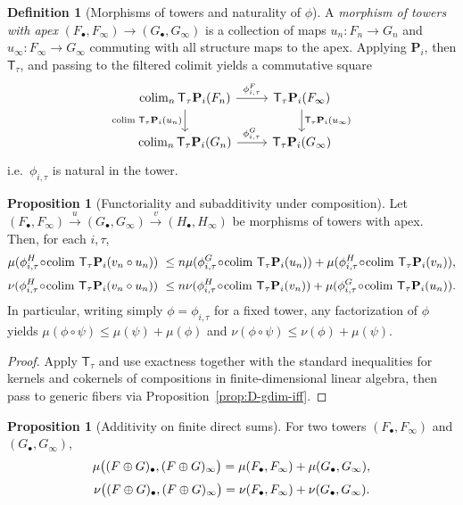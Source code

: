 \documentclass[11pt]{article}
\numberwithin{equation}{section}
\theoremstyle{plain}
\theoremstyle{definition}
\theoremstyle{remark}
\DeclareMathOperator{\colim}{colim}
\newcommand{\T}{\mathsf{T}}
\theoremstyle{plain}
\theoremstyle{definition}
\numberwithin{equation}{section}
\newtheorem{proposition}[theorem]{Proposition}
\theoremstyle{definition}
\newtheorem{definition}[theorem]{Definition}
\numberwithin{equation}{section}
\theoremstyle{plain}
\theoremstyle{definition}
\theoremstyle{remark}
\newcommand{\Pfun}{\mathbf{P}}
\providecommand{\n}{\unskip\space}
\begin{document}
\begin{definition}[Morphisms of towers and naturality of \(\phi\)]
A \emph{morphism of towers with apex} \((F_\bullet,F_\infty)\to(G_\bullet,G_\infty)\) is a collection of maps \(u_n:F_n\to G_n\) and \(u_\infty:F_\infty\to G_\infty\) commuting with all structure maps to the apex.
Applying \(\Pfun_i\), then \(\T_\tau\), and passing to the filtered colimit yields a commutative square
\[
\begin{tikzcd}\n\colim_n \T_\tau \Pfun_i(F_n) \arrow[r,"\phi^{F}_{i,\tau}"] \arrow[d,"\colim\,\T_\tau\Pfun_i(u_n)"'] &\n\T_\tau \Pfun_i(F_\infty) \arrow[d,"\T_\tau \Pfun_i(u_\infty)"] \\\n\colim_n \T_\tau \Pfun_i(G_n) \arrow[r,"\phi^{G}_{i,\tau}"] &\n\T_\tau \Pfun_i(G_\infty)\n\end{tikzcd}
\]
i.e.\ \(\phi_{i,\tau}\) is natural in the tower.
\end{definition}

\begin{proposition}[Functoriality and subadditivity under composition]\label{prop:D-subadd}
Let \((F_\bullet,F_\infty)\xrightarrow{u}(G_\bullet,G_\infty)\xrightarrow{v}(H_\bullet,H_\infty)\) be morphisms of towers with apex.
Then, for each \(i,\tau\),
\[
\mu(\phi^{H}_{i,\tau}\!\circ\!\colim\,\T_\tau\Pfun_i(v_n\circ u_n))\n\ \le\\n\mu(\phi^{G}_{i,\tau}\!\circ\!\colim\,\T_\tau\Pfun_i(u_n))+\mu(\phi^{H}_{i,\tau}\!\circ\!\colim\,\T_\tau\Pfun_i(v_n)),
\]
\[
\nu(\phi^{H}_{i,\tau}\!\circ\!\colim\,\T_\tau\Pfun_i(v_n\circ u_n))\n\ \le\\n\nu(\phi^{H}_{i,\tau}\!\circ\!\colim\,\T_\tau\Pfun_i(v_n))+\mu(\phi^{G}_{i,\tau}\!\circ\!\colim\,\T_\tau\Pfun_i(u_n)).
\]
In particular, writing simply \(\phi=\phi_{i,\tau}\) for a fixed tower, any factorization of \(\phi\) yields
\(\mu(\phi\circ\psi)\le \mu(\psi)+\mu(\phi)\) and \(\nu(\phi\circ\psi)\le \nu(\phi)+\mu(\psi)\).
\end{proposition}

\begin{proof}
Apply \(\T_\tau\) and use exactness together with the standard inequalities for kernels and cokernels of compositions in finite-dimensional linear algebra, then pass to generic fibers via Proposition~\ref{prop:D-gdim-iff}.
\end{proof}

\begin{proposition}[Additivity on finite direct sums]\label{prop:D-additive}
For two towers \((F_\bullet,F_\infty)\) and \((G_\bullet,G_\infty)\),
\[
\mu\big((F\oplus G)_\bullet,(F\oplus G)_\infty\big)\n=\mu(F_\bullet,F_\infty)+\mu(G_\bullet,G_\infty),
\]
\[
\nu\big((F\oplus G)_\bullet,(F\oplus G)_\infty\big)\n=\nu(F_\bullet,F_\infty)+\nu(G_\bullet,G_\infty).
\]
\end{proposition}
\end{document}
